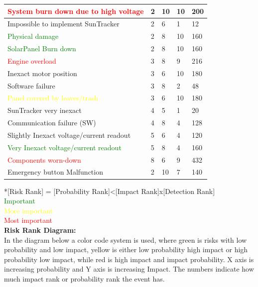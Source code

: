 \documentclass[12pt,a4paper]{report}
\begin{document}
\begin{tabular}{|p{10cm}|p{1cm}|p{1cm}|p{1cm}|p{1cm}|}
\hline \textcolor{red} {System burn down due to high voltage} & 2 & 10 & 10 & 200 \\ 
\hline Impossible to implement SunTracker & 2 & 6 & 1 & 12 \\ 
\hline \textcolor{green} {Physical damage} & 2 & 8 & 10 & 160 \\ 
\hline \textcolor{green} {SolarPanel Burn down} & 2 & 8 & 10 & 160 \\ 
\hline \textcolor{red} {Engine overload} & 3 & 8 & 9 & 216 \\ 
\hline Inexact motor position & 3 & 6 & 10 & 180 \\
\hline Software failure & 3 & 8 & 2 & 48 \\ 
\hline \textcolor{yellow}{Panel covered by leaves/trash} & 3 & 6 & 10 & 180 \\ 
\hline SunTracker very inexact & 4 & 5 & 1 & 20 \\ 
\hline Communication failure (SW) & 4 & 8 & 4 & 128 \\ 
\hline Slightly Inexact voltage/current readout & 5 & 6 & 4 & 120 \\ 
\hline \textcolor{green} {Very Inexact voltage/current readout} & 5 & 8 & 4 & 160 \\ 
\hline \textcolor{red} {Components worn-down} & 8 & 6 & 9 & 432 \\ 
\hline Emergency button Malfunction & 2 & 10 & 7 & 140 \\ 
\hline 
\end{tabular} 

*[Risk Rank] = [Probability Rank]<[Impact Rank]x[Detection Rank]
\\
\textcolor{green} {Important}
\\
\textcolor{yellow} {More important}
\\
\textcolor{red} {Most important}
\\

\textbf{Risk Rank Diagram:}\\

In the diagram below a color code system is used, where green is risks with low probability and low impact, yellow is either low probability high impact or high probability low impact, while red is high impact and impact probability. X axis is increasing probability and Y axis is increasing Impact.  The numbers indicate how much impact rank or probability rank the event has.\\
\end{document}
